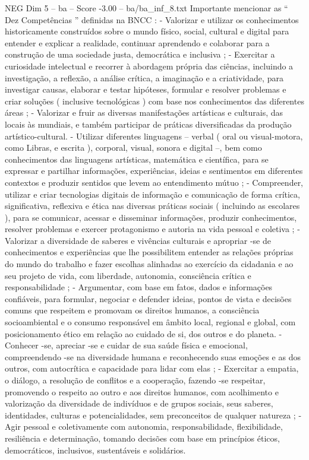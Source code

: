 \begin{textsample}{NEG Dim 5 – ba – Score -3.00 – ba/ba\_inf\_8.txt}
Importante mencionar as “ Dez Competências ” definidas na BNCC : - Valorizar e utilizar os conhecimentos historicamente construídos sobre o mundo físico, social, cultural e digital para entender e explicar a realidade, continuar aprendendo e colaborar para a construção de uma sociedade justa, democrática e inclusiva ; - Exercitar a curiosidade intelectual e recorrer à abordagem própria das ciências, incluindo a investigação, a reflexão, a análise crítica, a imaginação e a criatividade, para investigar causas, elaborar e testar hipóteses, formular e resolver problemas e criar soluções ( inclusive tecnológicas ) com base nos conhecimentos das diferentes áreas ; - Valorizar e fruir as diversas manifestações artísticas e culturais, das locais às mundiais, e também participar de práticas diversificadas da produção artístico-cultural. - Utilizar diferentes linguagens – verbal ( oral ou visual-motora, como Libras, e escrita ), corporal, visual, sonora e digital –, bem como conhecimentos das linguagens artísticas, matemática e científica, para se expressar e partilhar informações, experiências, ideias e sentimentos em diferentes contextos e produzir sentidos que levem ao entendimento mútuo ; - Compreender, utilizar e criar tecnologias digitais de informação e comunicação de forma crítica, significativa, reflexiva e ética nas diversas práticas sociais ( incluindo as escolares ), para se comunicar, acessar e disseminar informações, produzir conhecimentos, resolver problemas e exercer protagonismo e autoria na vida pessoal e coletiva ; - Valorizar a diversidade de saberes e vivências culturais e apropriar -se de conhecimentos e experiências que lhe possibilitem entender as relações próprias do mundo do trabalho e fazer escolhas alinhadas ao exercício da cidadania e ao seu projeto de vida, com liberdade, autonomia, consciência crítica e responsabilidade ; - Argumentar, com base em fatos, dados e informações confiáveis, para formular, negociar e defender ideias, pontos de vista e decisões comuns que respeitem e promovam os direitos humanos, a consciência socioambiental e o consumo responsável em âmbito local, regional e global, com posicionamento ético em relação ao cuidado de si, dos outros e do planeta. - Conhecer -se, apreciar -se e cuidar de sua saúde física e emocional, compreendendo -se na diversidade humana e reconhecendo suas emoções e as dos outros, com autocrítica e capacidade para lidar com elas ; - Exercitar a empatia, o diálogo, a resolução de conflitos e a cooperação, fazendo -se respeitar, promovendo o respeito ao outro e aos direitos humanos, com acolhimento e valorização da diversidade de indivíduos e de grupos sociais, seus saberes, identidades, culturas e potencialidades, sem preconceitos de qualquer natureza ; - Agir pessoal e coletivamente com autonomia, responsabilidade, flexibilidade, resiliência e determinação, tomando decisões com base em princípios éticos, democráticos, inclusivos, sustentáveis e solidários.

\end{textsample}
